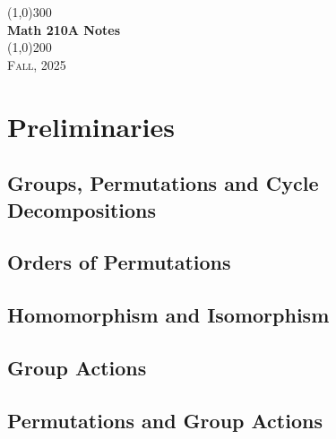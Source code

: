\documentclass[a4paper, openany]{book}
\begin{document}
\begin{titlepage}
    \begin{center}
        \line(1,0){300} \\
        [0.25in]
        \huge{\bfseries Math 210A Notes} \\
        [2mm]
        \line(1,0){200} \\
        [1.5cm]
        \textsc{\LARGE Fall, 2025}
    \end{center}
\end{titlepage}

\tableofcontents
\setcounter{section}{0}

\chapter{Preliminaries}
\section{Groups, Permutations and Cycle Decompositions}

\newpage

\section{Orders of Permutations}

\newpage

\section{Homomorphism and Isomorphism}

\newpage

\section{Group Actions}

\newpage

\section{Permutations and Group Actions}

\newpage
\end{document}
